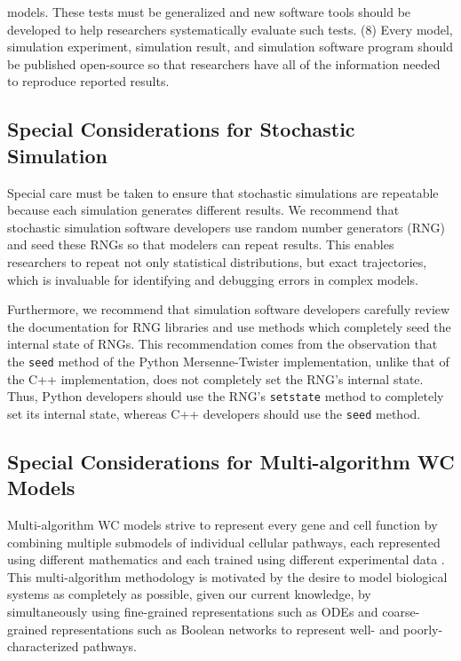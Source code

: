 \documentclass[journal,transmag,twoside]{IEEEtran}
\begin{document}
models. These tests must be generalized and new software tools should be developed to help researchers systematically evaluate such tests. (8) Every model, simulation experiment, simulation result, and simulation software program should be published open-source so that researchers have all of the information needed to reproduce reported results.

\subsection{Special Considerations for Stochastic Simulation}
Special care must be taken to ensure that stochastic simulations are repeatable because each simulation generates different results. We recommend that stochastic simulation software developers use random number generators (RNG) and seed these RNGs so that modelers can repeat results. This enables researchers to repeat not only statistical distributions, but exact trajectories, which is invaluable for identifying and debugging errors in complex models. 

Furthermore, we recommend that simulation software developers carefully review the documentation for RNG libraries and use methods which completely seed the internal state of RNGs. This recommendation comes from the observation that the \texttt{seed} method of the Python Mersenne-Twister implementation, unlike that of the C++ implementation, does not completely set the RNG's internal state. Thus, Python developers should use the RNG's \texttt{setstate} method to completely set its internal state, whereas C++ developers should use the \texttt{seed} method.

\subsection{Special Considerations for Multi-algorithm WC Models}
Multi-algorithm WC models strive to represent every gene and cell function by combining multiple submodels of individual cellular pathways, each represented using different mathematics and each trained using different experimental data \cite{Karr2015, macklin2014future, carrera2015build}. This multi-algorithm methodology is motivated by the desire to model biological systems as completely as possible, given our current knowledge, by simultaneously using fine-grained representations such as ODEs and coarse-grained representations such as Boolean networks to represent well- and poorly-characterized pathways. 
\end{document}
